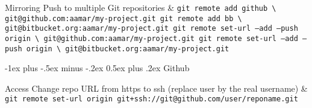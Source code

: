 \documentclass[10pt,english,landscape]{article}
\makeatletter
\renewcommand{\section}{\@startsection{section}{1}{0mm}%
{-1ex plus -.5ex minus -.2ex}%
{0.5ex plus .2ex}%
{\normalfont\large\bfseries}}
\makeatother
\begin{document}
\begin{multicols}{2}
    \begin{keys}{Mirroring}
      Push to multiple Git repositories &
      \texttt{git remote add github \textbackslash \newline
      \hspace*{0.5cm} git@github.com:aamar/my-project.git \newline
      git remote add bb \textbackslash \newline
      \hspace*{0.5cm} git@bitbucket.org:aamar/my-project.git \newline
      git remote set-url ---add ---push origin \textbackslash \newline
      \hspace*{0.5cm} git@github.com:aamar/my-project.git \newline
      git remote set-url ---add ---push origin \textbackslash \newline
      \hspace*{0.5cm} git@bitbucket.org:aamar/my-project.git
      } \\
    \end{keys}

    \centering\section{Github}

    \begin{keys}{Access}
      Change repo URL from https to ssh (replace user by the real username) &
      \texttt{git remote set-url origin git+ssh://git@github.com/user/reponame.git} \\
    \end{keys}


\end{multicols}
\end{document}

